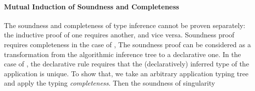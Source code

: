 \paragraph{Mutual Induction of Soundness and Completeness}

The soundness and completeness of type inference cannot be proven separately:
the inductive proof of one requires another, and vice versa. 
Soundness proof requires completeness in the case of 
,
The soundness proof can be considered as a transformation from the algorithmic 
inference tree to a declarative one. In the case of ,
the declarative rule requires that the (declaratively) inferred type of the application
is unique.  To show that, we take an arbitrary application typing tree and apply the typing
\emph{completeness}. Then the soundness of singularity 



